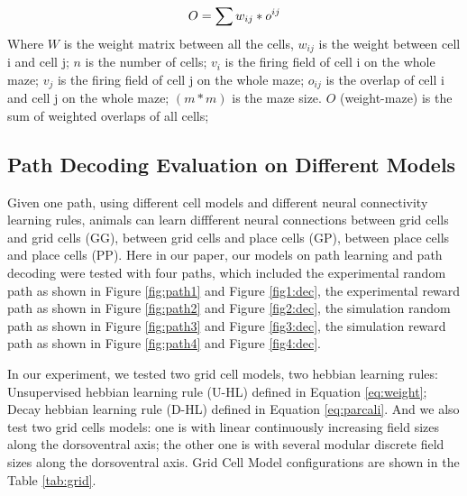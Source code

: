 \documentclass[11pt, letterpaper, onecolumn]{article}
\begin{document}
\begin{equation}
\label{eq:dec3}
    O = \sum {w_{ij}*o^{ij}} \\
\end{equation}
Where $W$ is the weight matrix between all the cells, $w_{ij}$ is the weight between cell i and cell j; $n$ is the number of cells; $v_{i}$ is the firing field of cell i on the whole maze; $v_{j}$ is the firing field of cell j on the whole maze; $o_{ij}$ is the overlap of cell i and cell j on the whole maze; $(m*m)$ is the maze size. $O$ (weight-maze) is the sum of weighted overlaps of all cells;

\subsection{Path Decoding Evaluation on Different Models}

Given one path, using different cell models and different neural connectivity learning rules, animals can learn diffferent neural connections between grid cells and grid cells (GG), between grid cells and place cells (GP), between place cells and place cells (PP). Here in our paper, our models on path learning and path decoding were tested with four paths, which included the experimental random path as shown in Figure \ref{fig:path1} and Figure \ref{fig1:dec}, the experimental reward path as shown in Figure \ref{fig:path2} and Figure \ref{fig2:dec}, the simulation random path as shown in Figure \ref{fig:path3} and Figure \ref{fig3:dec}, the simulation reward path as shown in Figure \ref{fig:path4} and Figure \ref{fig4:dec}.

In our experiment, we tested two grid cell models, two hebbian learning rules: Unsupervised hebbian learning rule (U-HL) defined in Equation \ref{eq:weight}; Decay hebbian learning rule (D-HL) defined in Equation \ref{eq:parcali}. And we also test two grid cells models: one is with linear continuously increasing field sizes along the dorsoventral axis; the other one is with several modular discrete field sizes along the dorsoventral axis. Grid Cell Model configurations are shown in the Table \ref{tab:grid}. 
\end{document}
